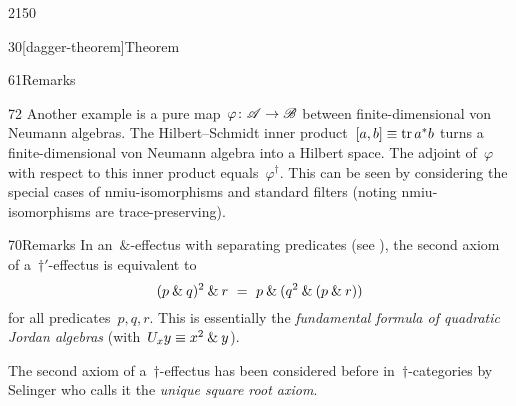 \begin{parsec}{2150}
\begin{point}{30}[dagger-theorem]{Theorem}
\begin{point}{61}{Remarks}
\begin{point}{72}
Another example is a pure map~$\varphi\colon \mathscr{A} \to \mathscr{B}$
    between finite-dimensional von Neumann algebras.
The Hilbert--Schmidt inner product~$[a, b] \equiv \mathop{\mathrm{tr}} a^*b$
    turns a finite-dimensional von Neumann algebra into a Hilbert space.
The adjoint of~$\varphi$ with respect to this inner product
    equals~$\varphi^\dagger$.
This can be seen by considering the special cases
    of nmiu-isomorphisms and standard filters
    (noting nmiu-isomorphisms are trace-preserving).
\end{point}
\end{point}
\begin{point}{70}{Remarks}%
    In an~$\&$-effectus
    with separating predicates
    (see ),
    the second axiom of a~$\dagger'$-effectus is equivalent
    to
\begin{equation*}
    (p \mathbin{\&} q)^2 \mathbin{\&} r
    \ =\  p \mathbin{\&} (q^2 \mathbin{\&} (p \mathbin{\&} r))
\end{equation*}
    for all predicates~$p,q,r$.
This is essentially the \emph{fundamental formula
    of quadratic Jordan algebras} \cite[\S4.2]{mccrimmon2006taste}
    (with~$U_x y \equiv x^2 \mathbin{\&} y$).

The second axiom of a~$\dagger$-effectus
    has been considered before in~$\dagger$-categories
    by Selinger \cite{selinger2008idempotents}
    who calls it the \emph{unique square root axiom}.
\end{point}
\end{point}
\end{parsec}


